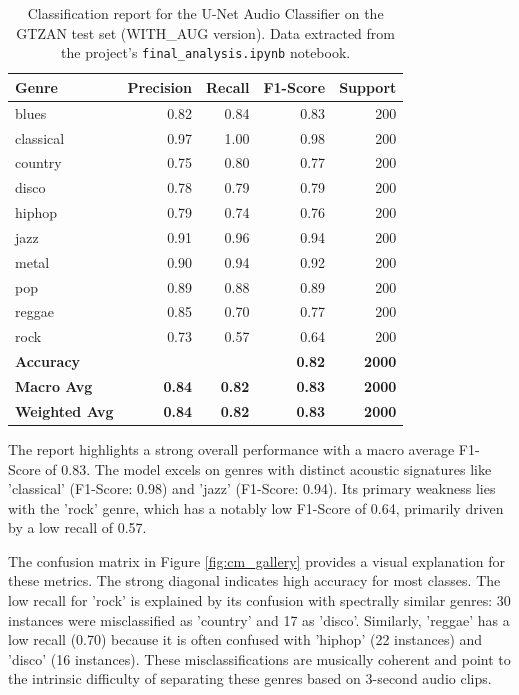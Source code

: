\documentclass[11pt,a4paper]{article}
\begin{document}
\begin{table}[H]
\centering
\caption{Classification report for the U-Net Audio Classifier on the GTZAN test set (WITH\_AUG version). Data extracted from the project's \texttt{final\_analysis.ipynb} notebook.}
\label{tab:classification_report}
\begin{tabular}{lrrrr}
\toprule
\textbf{Genre} & \textbf{Precision} & \textbf{Recall} & \textbf{F1-Score} & \textbf{Support} \\
\midrule
blues & 0.82 & 0.84 & 0.83 & 200 \\
classical & 0.97 & 1.00 & 0.98 & 200 \\
country & 0.75 & 0.80 & 0.77 & 200 \\
disco & 0.78 & 0.79 & 0.79 & 200 \\
hiphop & 0.79 & 0.74 & 0.76 & 200 \\
jazz & 0.91 & 0.96 & 0.94 & 200 \\
metal & 0.90 & 0.94 & 0.92 & 200 \\
pop & 0.89 & 0.88 & 0.89 & 200 \\
reggae & 0.85 & 0.70 & 0.77 & 200 \\
rock & 0.73 & 0.57 & 0.64 & 200 \\
\midrule
\textbf{Accuracy} & & & \textbf{0.82} & \textbf{2000} \\
\textbf{Macro Avg} & \textbf{0.84} & \textbf{0.82} & \textbf{0.83} & \textbf{2000} \\
\textbf{Weighted Avg} & \textbf{0.84} & \textbf{0.82} & \textbf{0.83} & \textbf{2000} \\
\bottomrule
\end{tabular}
\end{table}

The report highlights a strong overall performance with a macro average F1-Score of 0.83. The model excels on genres with distinct acoustic signatures like 'classical' (F1-Score: 0.98) and 'jazz' (F1-Score: 0.94). Its primary weakness lies with the 'rock' genre, which has a notably low F1-Score of 0.64, primarily driven by a low recall of 0.57.

The confusion matrix in Figure \ref{fig:cm_gallery} provides a visual explanation for these metrics. The strong diagonal indicates high accuracy for most classes. The low recall for 'rock' is explained by its confusion with spectrally similar genres: 30 instances were misclassified as 'country' and 17 as 'disco'. Similarly, 'reggae' has a low recall (0.70) because it is often confused with 'hiphop' (22 instances) and 'disco' (16 instances). These misclassifications are musically coherent and point to the intrinsic difficulty of separating these genres based on 3-second audio clips.
\end{document}
